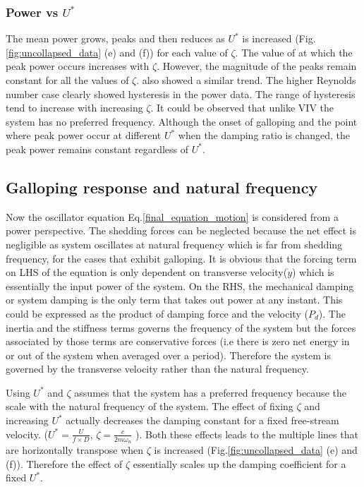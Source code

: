 
 \subsubsection*{Power vs $U^*$}
 
 The mean power grows, peaks and then reduces as $U^*$ is increased (Fig.\ref{fig:uncollapsed_data} (e) and (f)) for each value of $\zeta$. The value of  \ustar at which the peak power occurs increases with $\zeta$. However, the magnitude of the peaks remain constant for all the values of $\zeta$.  \cite{Barrero-Gil2010a} also showed a similar trend. The higher Reynolds number case clearly showed hysteresis in the power data. The range of hysteresis tend to increase with increasing $\zeta$. It could be observed that unlike VIV the  system has no preferred frequency. Although the onset of galloping and the point where peak power occur at different $U^*$ when the damping ratio is changed, the peak power remains constant regardless of $U^*$.
 
 \subsection{Galloping response and natural frequency}
 
 Now the oscillator equation Eq.\eqref{final_equation_motion} is considered from a power perspective. The shedding forces can be neglected because the net effect is negligible as system oscillates at natural frequency which is far from shedding frequency, for the cases that exhibit galloping. It is obvious that the forcing term on LHS of the equation is only dependent on transverse velocity($\dot{y}$) which is essentially the input power of the system. On the RHS, the mechanical damping or system damping is the only term that takes out power at any instant. This could be expressed as the product of damping force and the velocity ($P_d$). The inertia and the stiffness terms governs the frequency of the system but the forces associated by those terms are conservative forces (i.e there is zero net energy in or out of the system when averaged over a period). Therefore the system is governed by the transverse velocity rather than the natural frequency.
 

 Using $U^*$ and $\zeta$ assumes that the system has a preferred frequency because the scale with the natural frequency of the system. The effect of fixing $\zeta$ and increasing $U^*$ actually decreases the damping constant for a fixed free-stream velocity. ($U^*=\frac{U}{f \times D}$, $\zeta= \frac{c}{2 m \omega_n}$ ). Both these effects leads to the multiple lines that are horizontally transpose when $\zeta$ is increased (Fig.\ref{fig:uncollapsed_data} (e) and (f)). Therefore the effect of $\zeta$ essentially scales up the damping coefficient for a fixed $U^*$.
 

